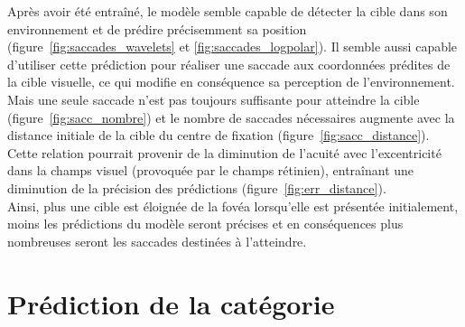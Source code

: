 Après avoir été entraîné, le modèle semble capable de détecter la cible dans son environnement et de prédire précisemment sa position (figure~\ref{fig:saccades_wavelets} et \ref{fig:saccades_logpolar}). Il semble aussi capable d'utiliser cette prédiction pour réaliser une saccade aux coordonnées prédites de la cible visuelle, ce qui modifie en conséquence sa perception de l'environnement.\\
Mais une seule saccade n'est pas toujours suffisante pour atteindre la cible (figure~\ref{fig:sacc_nombre}) et le nombre de saccades nécessaires augmente avec la distance initiale de la cible du centre de fixation (figure~\ref{fig:sacc_distance}). Cette relation pourrait provenir de la diminution de l'acuité avec l'excentricité dans la champs visuel (provoquée par le champs rétinien), entraînant une diminution de la précision des prédictions (figure~\ref{fig:err_distance}).\\
Ainsi, plus une cible est éloignée de la fovéa lorsqu'elle est présentée initialement, moins les prédictions du modèle seront précises et en conséquences plus nombreuses seront les saccades destinées à l'atteindre.


\section{Prédiction de la catégorie}

